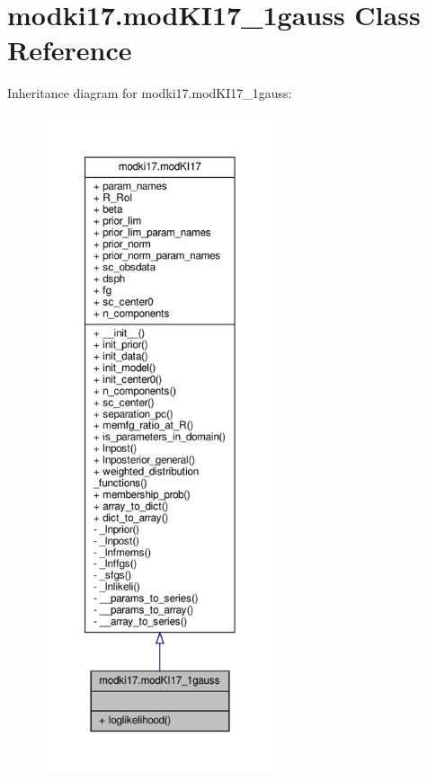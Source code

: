 \hypertarget{classmodki17_1_1modKI17__1gauss}{}\section{modki17.\+mod\+K\+I17\+\_\+1gauss Class Reference}
\label{classmodki17_1_1modKI17__1gauss}


Inheritance diagram for modki17.\+mod\+K\+I17\+\_\+1gauss\+:\nopagebreak
\begin{figure}[H]
\begin{center}
\leavevmode
\includegraphics[height=550pt]{d0/d77/classmodki17_1_1modKI17__1gauss__inherit__graph}
\end{center}
\end{figure}


